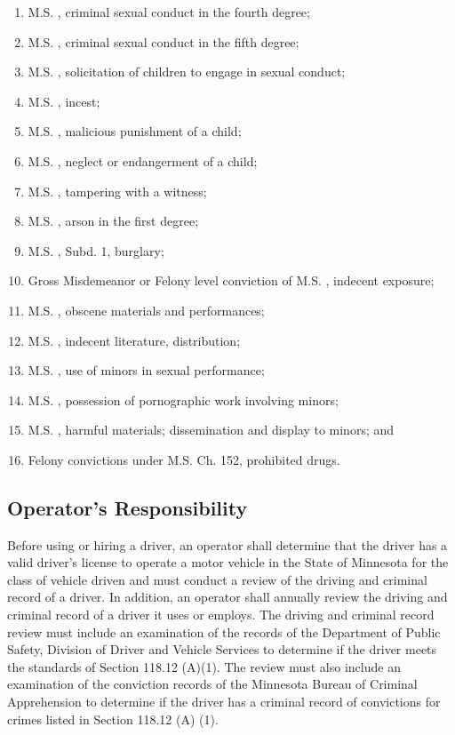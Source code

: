 \begin{enumerate}[{\indent}1)]
    \item M.S. , criminal sexual conduct in the fourth degree;
    \item M.S. , criminal sexual conduct in the fifth degree;
    \item M.S. , solicitation of children to engage in sexual conduct;
    \item M.S. , incest;
    \item M.S. , malicious punishment of a child;
    \item M.S. , neglect or endangerment of a child;
    \item M.S. , tampering with a witness;
    \item M.S. , arson in the first degree;
    \item M.S. , Subd. 1, burglary;
    \item Gross Misdemeanor or Felony level conviction of M.S. , indecent exposure;
    \item M.S. , obscene materials and performances;
    \item M.S. , indecent literature, distribution;
    \item M.S. , use of minors in sexual performance;
    \item M.S. , possession of pornographic work involving minors;
    \item M.S. , harmful materials; dissemination and display to minors; and
    \item Felony convictions under M.S. Ch. 152, prohibited drugs.
\end{enumerate}
\subsection{Operator’s Responsibility}
Before using or hiring a driver, an operator shall determine that the driver has a valid driver’s license to operate a motor vehicle in the State of Minnesota for the class of vehicle driven and must conduct a review of the driving and criminal record of a driver.  In addition, an operator shall annually review the driving and criminal record of a driver it uses or employs.  The driving and criminal record review must include an examination of the records of the Department of Public Safety, Division of Driver and Vehicle Services to determine if the driver meets the standards of Section 118.12 (A)(1).  The review must also include an examination of the conviction records of the Minnesota Bureau of Criminal Apprehension to determine if the driver has a criminal record of convictions for crimes listed in Section 118.12 (A) (1).
